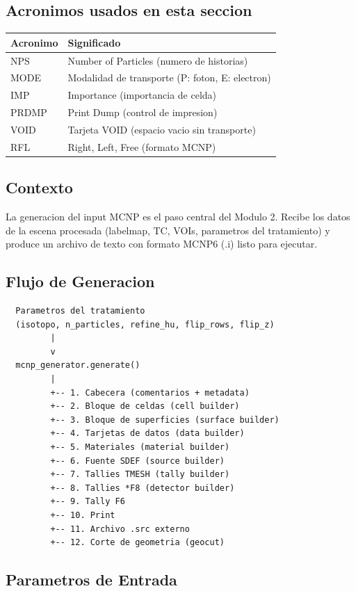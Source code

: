 \documentclass[12pt,a4paper]{article}
\begin{document}
\subsection*{Acronimos usados en esta seccion}
\begin{tabular}{ll}
\toprule
\textbf{Acronimo} & \textbf{Significado} \\
\midrule
NPS & Number of Particles (numero de historias) \\
MODE & Modalidad de transporte (P: foton, E: electron) \\
IMP & Importance (importancia de celda) \\
PRDMP & Print Dump (control de impresion) \\
VOID & Tarjeta VOID (espacio vacio sin transporte) \\
RFL & Right, Left, Free (formato MCNP) \\
\bottomrule
\end{tabular}

\subsection{Contexto}

La generacion del input MCNP es el paso central del Modulo 2. Recibe los datos de la escena procesada (labelmap, TC, VOIs, parametros del tratamiento) y produce un archivo de texto con formato MCNP6 (.i) listo para ejecutar.

\subsection{Flujo de Generacion}

\begin{verbatim}
  Parametros del tratamiento
  (isotopo, n_particles, refine_hu, flip_rows, flip_z)
         |
         v
  mcnp_generator.generate()
         |
         +-- 1. Cabecera (comentarios + metadata)
         +-- 2. Bloque de celdas (cell builder)
         +-- 3. Bloque de superficies (surface builder)
         +-- 4. Tarjetas de datos (data builder)
         +-- 5. Materiales (material builder)
         +-- 6. Fuente SDEF (source builder)
         +-- 7. Tallies TMESH (tally builder)
         +-- 8. Tallies *F8 (detector builder)
         +-- 9. Tally F6
         +-- 10. Print
         +-- 11. Archivo .src externo
         +-- 12. Corte de geometria (geocut)
\end{verbatim}

\subsection{Parametros de Entrada}
\end{document}
